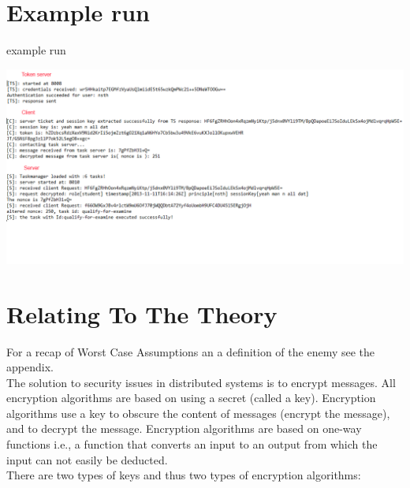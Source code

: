 \section{Example run}

\begin{center}
\centering
\caption{example run}
\includegraphics[scale=0.5]{images/security_run.png}
\end{center}
\vspace{10pt}

\section{Relating To The Theory}

For a recap of Worst Case Assumptions an a definition of the enemy see the appendix.\\

The solution to security issues in distributed systems is to encrypt messages. All encryption algorithms are based on using a secret (called a key). Encryption algorithms use a key to obscure the content of messages (encrypt the message), and to decrypt the message. Encryption algorithms are based on one-way functions i.e., a function that converts an input to an output from which the input can not easily be deducted. \\ 

There are two types of keys and thus two types of encryption algorithms: \\

